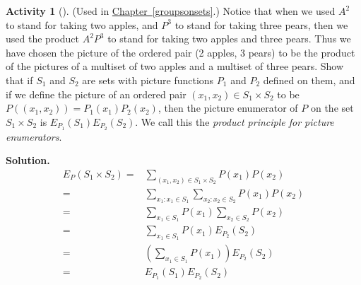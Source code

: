 \documentclass[10pt,]{book}
\theoremstyle{plain}
\theoremstyle{definition}
\newtheorem{activity}[project]{Activity}
\numberwithin{equation}{chapter}
\newcommand{\amp}{&}
\begin{document}
\begin{activity}[]\label{activity-170}
(Used in \hyperref[groupsonsets]{Chapter~\ref{groupsonsets}}.) Notice that when we used \(A^2\) to stand for taking two apples, and \(P^3\) to stand for taking three pears, then we used the product \(A^2P^3\) to stand for taking two apples and three pears. Thus we have chosen the picture of the ordered pair (2 apples, 3 pears) to be the product of the pictures of a multiset of two apples and a multiset of three pears. Show that if \(S_1\) and \(S_2\) are sets with picture functions \(P_1\) and \(P_2\) defined on them, and if we define the picture of an ordered pair \((x_1,x_2)\in S_1\times S_2\) to be \(P((x_1,x_2))= P_1(x_1)P_2(x_2)\), then the picture enumerator of \(P\) on the set \(S_1\times S_2\) is \(E_{P_1}(S_1)E_{P_2}(S_2)\). We call this the \emph{product principle for picture enumerators}.%
\par\medskip\noindent%
\textbf{Solution.}\quad %
\begin{align*}
E_P(S_1\times S_2) =\amp \sum_{(x_1,x_2)\in S_1\times
S_2} P(x_1)P(x_2)\\
=\amp
\sum_{x_1:x_1\in S_1}\sum_{x_2:x_2\in S_2} P(x_1)P(x_2)\\
=\amp \sum_{x_1\in S_1}P(x_1)\sum_{x_2\in S_2}P(x_2)\\
=\amp \sum_{x_1\in S_1} P(x_1) E_{P_2}(S_2)\\
=\amp \left(\sum_{x_1\in S_1} P(x_1)\right)E_{P_2}(S_2)\\
=\amp E_{P_1}(S_1)E_{P_2}(S_2)
\end{align*}
%
\end{activity}
\typeout{************************************************}
\typeout{************************************************}
\end{document}
